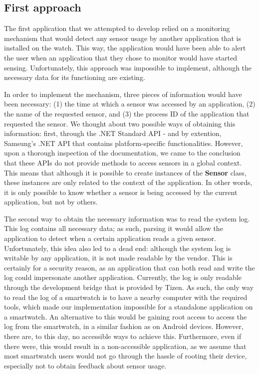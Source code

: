 \documentclass[conference, a4paper, 10pt, twocolumn]{IEEEtran}
\begin{document}
\subsection{First approach}
The first application that we attempted to develop relied on a monitoring mechanism that would detect any sensor usage by another application that is installed on the watch. This way, the application would have been able to alert the user when an application that they chose to monitor would have started sensing. Unfortunately, this approach was impossible to implement, although the necessary data for its functioning are existing.

In order to implement the mechanism, three pieces of information would have been necessary: (1) the time at which a sensor was accessed by an application, (2) the name of the requested sensor, and (3) the process ID of the application that requested the sensor. We thought about two possible ways of obtaining this information: first, through the .NET Standard \ac{API} - and by extention, Samsung's .NET \ac{API} that contains platform-specific functionalities\cite{tizen}. However, upon a thorough inspection of the documentation, we came to the conclusion that these \acp{API} do not provide methods to access sensors in a global context. This means that although it is possible to create instances of the \textbf{Sensor} class, these instances are only related to the context of the application. In other words, it is only possible to know whether a sensor is being accessed by the current application, but not by others. 

The second way to obtain the necessary information was to read the system log. This log contains all necessary data; as such, parsing it would allow the application to detect when a certain application reads a given sensor. Unfortunately, this idea also led to a dead end: although the system log is writable by any application, it is not made readable by the vendor. This is certainly for a security reason, as an application that can both read and write the log could impersonate another application. Currently, the log is only readable through the development bridge that is provided by Tizen. As such, the only way to read the log of a smartwatch is to have a nearby computer with the required tools, which made our implementation impossible for a standalone application on a smartwatch. An alternative to this would be gaining root access to access the log from the smartwatch, in a similar fashion as on Android devices. However, there are, to this day, no accessible ways to achieve this. Furthermore, even if there were, this would result in a non-accessible application, as we assume that most smartwatch users would not go through the hassle of rooting their device, especially not to obtain feedback about sensor usage. 
\end{document}
